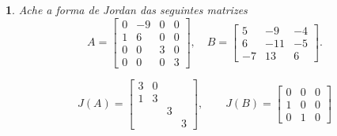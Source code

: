 \documentclass[12pt]{exam}
\newtheorem{exercicio}{}
\begin{document}
\begin{exercicio}
  Ache a forma de Jordan das seguintes matrizes
  \[
      A = \begin{bmatrix}
      0 & -9 & 0 & 0\\
      1 & 6 & 0 & 0\\
      0 & 0 & 3 & 0\\
      0 & 0 & 0 & 3
    \end{bmatrix}, \quad B = \begin{bmatrix}
      5 & -9 & -4\\
      6 & -11 & -5\\
      -7 & 13 & 6
    \end{bmatrix}.
  \]
  \begin{solucao}
    \[
      J(A) = \begin{bmatrix}
        3 & 0\\
        1 & 3\\
        & & 3\\
        & & & 3
      \end{bmatrix}, \qquad J(B) = \begin{bmatrix}
        0 & 0 & 0\\
        1 & 0 & 0\\
        0 & 1 & 0
      \end{bmatrix}
    \]
  \end{solucao}
\end{exercicio}
\end{document}
